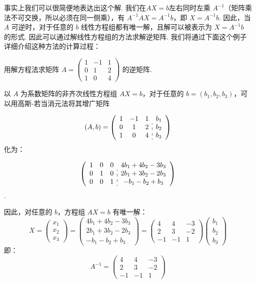 事实上我们可以很简便地表达出这个解. 我们在$AX=b$左右同时左乘 $A^{-1}$（矩阵乘法不可交换，所以必须在同一侧乘），有 $A^{-1}AX = A^{-1}b$，即 $X = A^{-1}b$. 因此，当 $A$ 可逆时，对于任意的 $b$ 线性方程组都有唯一解，且解可以被表示为 $X = A^{-1}b$ 的形式. 因此可以通过解线性方程组的方法求解逆矩阵. 我们将通过下面这个例子详细介绍这种方法的计算过程：
\begin{example}{}{}
    用解方程法求矩阵 $A = \begin{pmatrix}1 & -1 & 1 \\ 0 & 1 & 2 \\ 1 & 0 & 4\end{pmatrix}$ 的逆矩阵.
\end{example}

\begin{solution}
    以 $A$ 为系数矩阵的非齐次线性方程组 $AX = b$，对于任意的 $b = (b_1, b_2, b_3)$，可以用高斯-若当消元法将其增广矩阵

    \[(A,b)=\left(\begin{array}{ccc:c}
                1 & -1 & 1 & b_1 \\
                0 & 1  & 2 & b_2 \\
                1 & 0  & 4 & b_3
            \end{array}\right)\] 化为：

    \[\left(\begin{array}{ccc:c}
                1 & 0 & 0 & 4b_1+4b_2-3b_3 \\
                0 & 1 & 0 & 2b_1+3b_2-2b_3 \\
                0 & 0 & 1 & -b_1-b_2+b_3
            \end{array}\right)\].

    因此，对任意的 $b$，方程组 $AX=b$ 有唯一解：
    \[X=\begin{pmatrix}x_1\\x_2\\x_3\end{pmatrix}=\begin{pmatrix}
            4b_1+4b_2-3b_3 \\2b_1+3b_2-2b_3\\-b_1-b_2+b_3
        \end{pmatrix}=\begin{pmatrix}
            4  & 4  & -3 \\
            2  & 3  & -2 \\
            -1 & -1 & 1
        \end{pmatrix}\begin{pmatrix}b_1\\b_2\\b_3\end{pmatrix}\] 即：
    \[A^{-1}=\begin{pmatrix}
            4  & 4  & -3 \\
            2  & 3  & -2 \\
            -1 & -1 & 1
        \end{pmatrix}\]
\end{solution}

